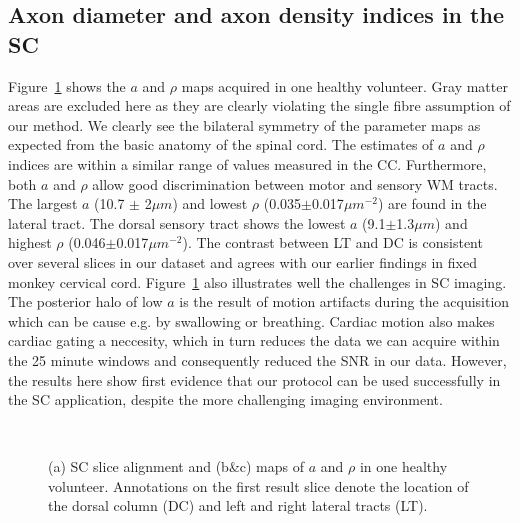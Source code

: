 \subsection*{Axon diameter and axon density indices in the SC}
Figure~\ref{fig:chap 9 SC results} shows the $a$ and $\rho$ maps acquired in one healthy volunteer. Gray matter areas are excluded here as they are clearly violating the single fibre assumption of our method.  We clearly see the bilateral symmetry of the parameter maps as expected from the basic anatomy of the spinal cord. The estimates of $a$ and $\rho$ indices are within a similar range of values measured in the CC. Furthermore, both $a$ and $\rho$ allow good discrimination between motor and sensory WM tracts. The largest $a$ (10.7 $\pm$ 2$\mu m$) and lowest $\rho$ (0.035$\pm$0.017$\mu m^{-2}$) are found in the lateral tract. The dorsal sensory tract shows the lowest $a$ (9.1$\pm$1.3$\mu m$) and highest $\rho$ (0.046$\pm$0.017$\mu m^{-2}$). The contrast between LT and DC is consistent over several slices in our dataset and agrees with our earlier findings in fixed monkey cervical cord. Figure~\ref{fig:chap 9 SC results} also illustrates well the challenges in SC imaging. The posterior halo of low $a$ is the result of motion artifacts during the acquisition which can be cause e.g. by swallowing or breathing. Cardiac motion also makes cardiac gating a neccesity, which in turn reduces the data we can acquire within the 25 minute windows and consequently reduced the SNR in our data. However, the results here show first evidence that our \SFasym{} protocol can be used successfully in the SC application, despite the more challenging imaging environment.
\begin{figure}[ht]
	\centering
	\begin{minipage}{0.39\textwidth}
	\end{minipage}
	\begin{minipage}{0.59\textwidth}
			\\
	\end{minipage}
	\caption{(a) SC slice alignment  and  (b\&c) maps of $a$ and $\rho$ in one healthy volunteer. Annotations on the first result slice denote the location of the dorsal column (DC) and left and right lateral tracts (LT).}
	\label{fig:chap 9 SC results}
\end{figure}

